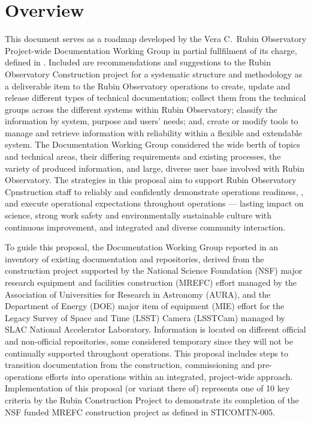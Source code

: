 \section{Overview}

This document serves as a roadmap developed by the Vera C.\ Rubin Observatory Project-wide Documentation Working Group in partial fullfilment of its charge,  defined in .
Included are recommendations and suggestions to the Rubin Observatory Construction project for a systematic structure and methodology as a deliverable item to the Rubin Observatory operations to create, update and release different types of technical documentation; collect them from the technical groups across the different systems within Rubin Observatory; classify the information by system, purpose and users' needs; and, create or modify tools to manage and retrieve information with reliability within a flexible and extendable system.
The Documentation Working Group considered the wide berth of topics and technical areas, their differing requirements and existing processes, the variety of produced information, and large, diverse user base involved with Rubin Observatory.
The strategies in this proposal aim to support Rubin Observatory Cpnstruction staff to reliably and confidently demonstrate operations readiness, ,  and execute operational expectations throughout operations --- lasting impact on science, strong work safety and environmentally sustainable culture with continuous improvement, and integrated and diverse community interaction.  

To guide this proposal, the Documentation Working Group reported in  an inventory of existing documentation and repositories, derived from  the construction project supported by the National Science Foundation (NSF) major research equipment and facilities construction (MREFC) effort managed by the Association of Universities for Research in Astronomy (AURA), and the Department of Energy (DOE) major item of equipment (MIE) effort for the Legacy Survey of Space and Time (LSST) Camera (LSSTCam) managed by SLAC National Accelerator Laboratory.
Information is located on different official and non-official repositories, some considered temporary since they will not be continually supported throughout operations.
This proposal includes steps to transition documentation from the construction, commissioning and pre-operations efforts into operations within an integrated, project-wide approach.  Implementation of this proposal (or variant there of) represents one of 10 key criteria by the Rubin Construction Project to demonstrate its completion of the NSF funded MREFC construction project as defined in STICOMTN-005.

